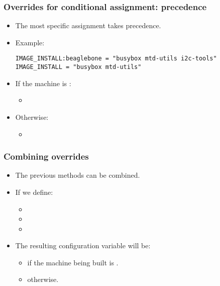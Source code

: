 \begin{frame}[fragile]
  \frametitle{Overrides for conditional assignment: precedence}
  \begin{itemize}
    \item The most specific assignment takes precedence.
    \item Example:
      \begin{verbatim}
IMAGE_INSTALL:beaglebone = "busybox mtd-utils i2c-tools"
IMAGE_INSTALL = "busybox mtd-utils"
      \end{verbatim}
    \item If the machine is :
      \begin{itemize}
        \item {}
      \end{itemize}
    \item Otherwise:
      \begin{itemize}
        \item {}
      \end{itemize}
  \end{itemize}
\end{frame}

\begin{frame}
  \frametitle{Combining overrides}
  \begin{itemize}
    \item The previous methods can be combined.
    \item If we define:
      \begin{itemize}
        \item {}
        \item {}
        \item {}
      \end{itemize}
    \item The resulting configuration variable will be:
      \begin{itemize}
        \item {} if the machine being built is
          .
        \item {}
          otherwise.
      \end{itemize}
  \end{itemize}
\end{frame}

